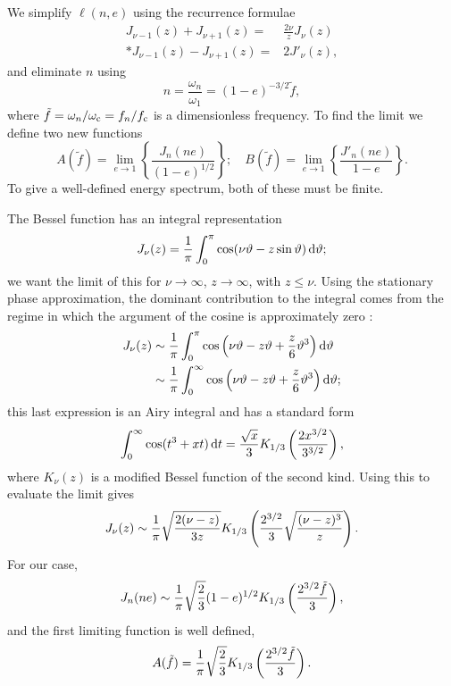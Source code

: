 We simplify $\ell(n,e)$ using the recurrence formulae \citep[section 2.12]{Watson1995}
\begin{align}
J_{\nu-1}(z) + J_{\nu+1}(z)  = {} & \frac{2\nu}{z}J_\nu(z)\\*
J_{\nu-1}(z) - J_{\nu+1}(z)  = {} & 2J'_\nu(z),\label{eq:J_derivative}
\end{align}
and eliminate $n$ using
\begin{equation}
n = \frac{\omega_n}{\omega_1} = (1-e)^{-3/2}\tilde{f},
\end{equation}
where $\tilde{f} = \omega_n/\omega_\mathrm{c} = f_n/f_\mathrm{c}$ is a dimensionless frequency. To find the limit we define two new functions
\begin{equation}
A(\tilde{f}) = \lim_{e\rightarrow 1}\left\{\frac{J_n(ne)}{(1-e)^{1/2}}\right\}; \quad B(\tilde{f}) = \lim_{e\rightarrow 1}\left\{\frac{J'_n(ne)}{1-e}\right\}.
\end{equation}
To give a well-defined energy spectrum, both of these must be finite.

The Bessel function has an integral representation
\begin{equation}
J_\nu(z) = \frac{1}{\pi}\int_{0}^{\pi}{\cos(\nu\vartheta - z\sin\vartheta)}\,\mathrm{d}{\vartheta};
\end{equation}
we want the limit of this for $\nu \rightarrow \infty$, $z \rightarrow \infty$, with $z \leq \nu$. Using the stationary phase approximation, the dominant contribution to the integral comes from the regime in which the argument of the cosine is approximately zero \citep[sections 8.2, 8.43]{Watson1995}:
\begin{align}
J_\nu(z)  \sim {} & \frac{1}{\pi}\int_{0}^{\pi}{\cos\left(\nu\vartheta - z\vartheta + \frac{z}{6}\vartheta^3\right)}\,\mathrm{d}{\vartheta}\\*
  \sim {} & \frac{1}{\pi}\int_{0}^{\infty}{\cos\left(\nu\vartheta - z\vartheta + \frac{z}{6}\vartheta^3\right)}\,\mathrm{d}{\vartheta};
\end{align}
this last expression is an Airy integral and has a standard form \citep[section 6.4]{Watson1995}
\begin{equation}
\int_{0}^{\infty}{\cos(t^3 + xt)}\,\mathrm{d}{t} = \frac{\sqrt{x}}{3}K_{1/3}\left(\frac{2x^{3/2}}{3^{3/2}}\right),
\end{equation}
where $K_\nu(z)$ is a modified Bessel function of the second kind. Using this to evaluate the limit gives
\begin{equation}
J_\nu(z) \sim \frac{1}{\pi}\sqrt{\frac{2(\nu - z)}{3z}}K_{1/3}\left(\frac{2^{3/2}}{3}\sqrt{\frac{(\nu -z)^3}{z}}\right).
\label{eq:J_nu}
\end{equation}
For our case,
\begin{equation}
J_n(ne) \sim \frac{1}{\pi}\sqrt{\frac{2}{3}}(1-e)^{1/2}K_{1/3}\left(\frac{2^{3/2}\tilde{f}}{3}\right),
\end{equation}
and the first limiting function is well defined,
\begin{equation}
A(\tilde{f}) = \frac{1}{\pi}\sqrt{\frac{2}{3}}K_{1/3}\left(\frac{2^{3/2}\tilde{f}}{3}\right).
\end{equation}

